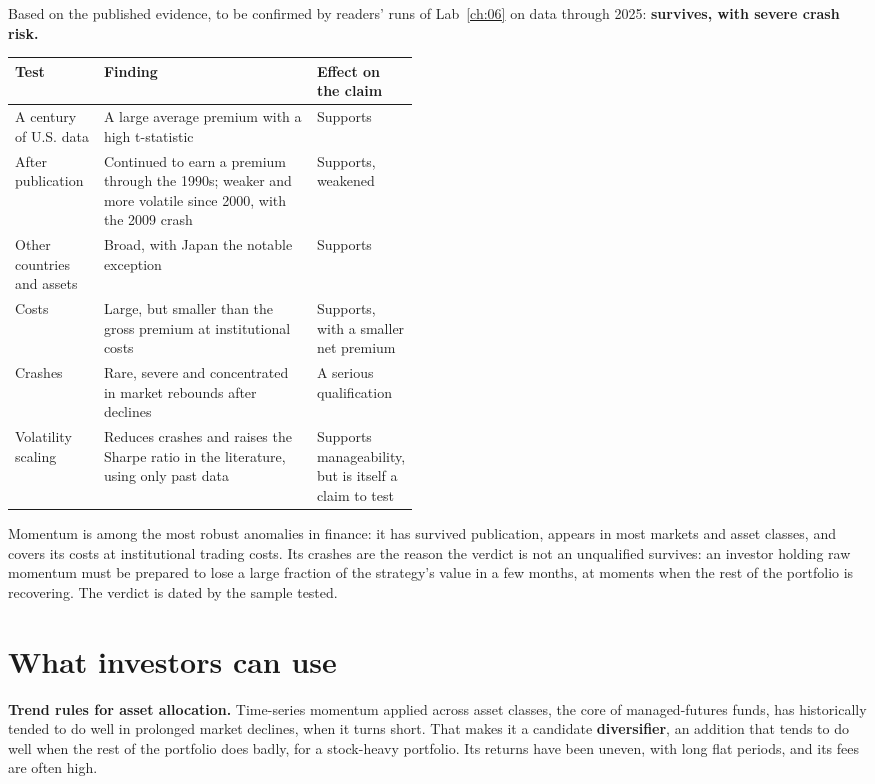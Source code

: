 Based on the published evidence, to be confirmed by readers' runs of Lab~\ref{ch:06} on data through 2025: \textbf{survives, with severe crash risk.}

\begin{center}
\small
\begin{tabularx}{0.9\linewidth}{@{}>{\raggedright\arraybackslash}p{0.22\linewidth}>{\raggedright\arraybackslash}X>{\raggedright\arraybackslash}p{0.25\linewidth}@{}}
\toprule
Test & Finding & Effect on the claim \\
\midrule
A century of U.S. data & A large average premium with a high t-statistic & Supports \\
After publication & Continued to earn a premium through the 1990s; weaker and more volatile since 2000, with the 2009 crash & Supports, weakened \\
Other countries and assets & Broad, with Japan the notable exception & Supports \\
Costs & Large, but smaller than the gross premium at institutional costs & Supports, with a smaller net premium \\
Crashes & Rare, severe and concentrated in market rebounds after declines & A serious qualification \\
Volatility scaling & Reduces crashes and raises the Sharpe ratio in the literature, using only past data & Supports manageability, but is itself a claim to test \\
\bottomrule
\end{tabularx}
\end{center}

Momentum is among the most robust anomalies in finance: it has survived publication, appears in most markets and asset classes, and covers its costs at institutional trading costs. Its crashes are the reason the verdict is not an unqualified survives: an investor holding raw momentum must be prepared to lose a large fraction of the strategy's value in a few months, at moments when the rest of the portfolio is recovering. The verdict is dated by the sample tested.

\section{What investors can use}
\label{sec:06-investors}

\textbf{Trend rules for asset allocation.} Time-series momentum applied across asset classes, the core of managed-futures funds, has historically tended to do well in prolonged market declines, when it turns short. That makes it a candidate \textbf{diversifier}, an addition that tends to do well when the rest of the portfolio does badly, for a stock-heavy portfolio. Its returns have been uneven, with long flat periods, and its fees are often high.

